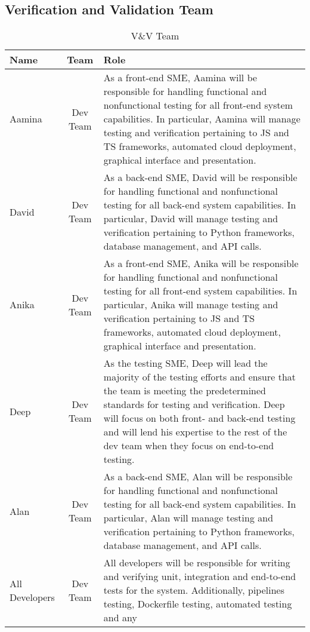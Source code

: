 \documentclass[12pt, titlepage]{article}
\begin{document}
\subsection{Verification and Validation Team}
\begin{table}[H]
    \caption{ V\&V Team}
    \begin{tabular}{|p{1.4cm}|c|p{12.5cm}|}
        \hline
        \textbf{Name} & \textbf{Team} & \textbf{Role} \\
        \hline 
        Aamina & Dev Team & As a front-end SME, Aamina will be responsible for handling functional and 
        nonfunctional testing for all front-end system capabilities. In particular, Aamina will manage 
        testing and verification pertaining to JS and TS frameworks, automated cloud deployment, graphical interface and presentation.\\
        \hline 
        David & Dev Team & As a back-end SME, David will be responsible for handling functional and nonfunctional testing 
        for all back-end system capabilities. In particular, David will manage testing and verification 
        pertaining to Python frameworks, database management, and API calls. \\
        \hline
        Anika & Dev Team & As a front-end SME, Anika will be responsible for handling functional and 
        nonfunctional testing for all front-end system capabilities. In particular, Anika will manage 
        testing and verification pertaining to JS and TS frameworks, automated cloud deployment, graphical interface and presentation.\\
        \hline
        Deep & Dev Team & As the testing SME, Deep will lead the majority of the testing efforts and ensure that the team is meeting
        the predetermined standards for testing and verification. Deep will focus on both
        front- and back-end testing and will lend his expertise to the rest of the dev team when they focus on end-to-end testing. \\
        \hline
        Alan & Dev Team & As a back-end SME, Alan will be responsible for handling functional and nonfunctional testing 
        for all back-end system capabilities. In particular, Alan will manage testing and verification 
        pertaining to Python frameworks, database management, and API calls. \\
        \hline
        All Developers & Dev Team & All developers will be responsible for writing and verifying unit, integration and 
        end-to-end tests for the system. Additionally, pipelines testing, Dockerfile testing, automated testing and any 

\end{tabular}
\end{table}
\end{document}
